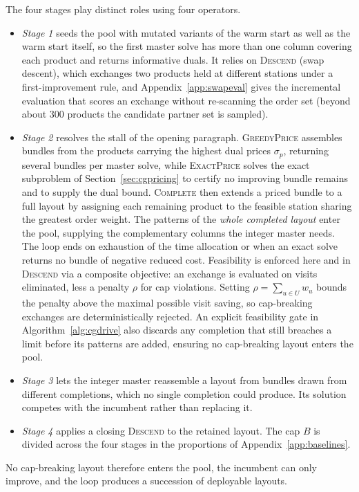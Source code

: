 \documentclass[]{interact}
\begin{document}
The four stages play distinct roles using four operators.
\begin{itemize}
\item \emph{Stage 1} seeds the pool with mutated variants of the warm start as well as the warm start itself, so the first master solve has more than one column covering each product and returns informative duals. It relies on \textsc{Descend} (swap descent), which exchanges two products held at different stations under a first-improvement rule, and Appendix~\ref{app:swapeval} gives the incremental evaluation that scores an exchange without re-scanning the order set (beyond about 300 products the candidate partner set is sampled).
\item \emph{Stage 2} resolves the stall of the opening paragraph. \textsc{GreedyPrice} assembles bundles from the products carrying the highest dual prices $\sigma_p$, returning several bundles per master solve, while \textsc{ExactPrice} solves the exact subproblem of Section~\ref{sec:cgpricing} to certify no improving bundle remains and to supply the dual bound. \textsc{Complete} then extends a priced bundle to a full layout by assigning each remaining product to the feasible station sharing the greatest order weight. The patterns of the \emph{whole completed layout} enter the pool, supplying the complementary columns the integer master needs. The loop ends on exhaustion of the time allocation or when an exact solve returns no bundle of negative reduced cost. Feasibility is enforced here and in \textsc{Descend} via a composite objective: an exchange is evaluated on visits eliminated, less a penalty $\rho$ for cap violations. Setting $\rho = \sum_{u \in U} w_u$ bounds the penalty above the maximal possible visit saving, so cap-breaking exchanges are deterministically rejected. An explicit feasibility gate in Algorithm~\ref{alg:cgdrive} also discards any completion that still breaches a limit before its patterns are added, ensuring no cap-breaking layout enters the pool.
\item \emph{Stage 3} lets the integer master reassemble a layout from bundles drawn from different completions, which no single completion could produce. Its solution competes with the incumbent rather than replacing it.
\item \emph{Stage 4} applies a closing \textsc{Descend} to the retained layout. The cap $B$ is divided across the four stages in the proportions of Appendix~\ref{app:baselines}.
\end{itemize}

No cap-breaking layout therefore enters the pool, the incumbent can only improve, and the loop produces a succession of deployable layouts.
\end{document}
